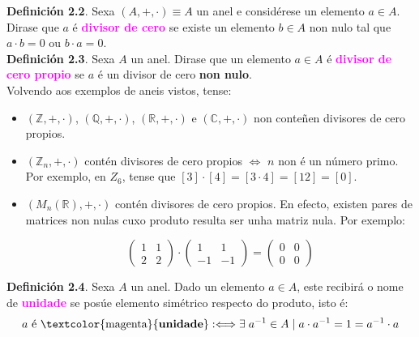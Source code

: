 \documentclass[twoside]{report}
\newcommand{\magbf}[1]{\textcolor{magenta}{\textbf{#1}}} %
\theoremstyle{mystyle}
\begin{document}
\noindent \textbf{Definición 2.2}. Sexa $(A,+,\cdot) \equiv A$ un anel e considérese un elemento $a \in A$. Dirase que $a$ é \magbf{divisor de cero} se existe un elemento $b \in A$ non nulo tal que $a \cdot b = 0$ ou $b \cdot a = 0$.\\

\noindent \textbf{Definición 2.3}. Sexa $A$ un anel. Dirase que un elemento $a \in A$ é \magbf{divisor de cero propio} se $a$ é un divisor de cero \textbf{non nulo}.\\

\noindent Volvendo aos exemplos de aneis vistos, tense:\\

\begin{itemize}

    \item $(\mathbb{Z},+,\cdot)$, $(\mathbb{Q},+,\cdot)$, $(\mathbb{R},+,\cdot)$ e $(\mathbb{C},+,\cdot)$ non conteñen divisores de cero propios.
    
    \item $(\mathbb{Z}_{n},+,\cdot)$ contén divisores de cero propios $\Longleftrightarrow$ $n$ non é un número primo. Por exemplo, en $Z_{6}$, tense que $[3] \cdot [4] = [3 \cdot 4] = [12] = [0]$.
    
    \item $(M_{n}(\mathbb{R}),+,\cdot)$ contén divisores de cero propios. En efecto, existen pares de matrices non nulas cuxo produto resulta ser unha matriz nula. Por exemplo:
    
    $$\begin{pmatrix}
    1 & 1\\
    2 & 2
    \end{pmatrix}
    \cdot
    \begin{pmatrix}
    1 & 1 \\
    -1 & -1
    \end{pmatrix}
    = \begin{pmatrix}
    0 & 0 \\
    0 & 0
    \end{pmatrix}$$
    
\end{itemize}

\noindent \textbf{Definición 2.4}. Sexa $A$ un anel. Dado un elemento $a \in A$, este recibirá o nome de \magbf{unidade} se posúe elemento simétrico respecto do produto, isto é:
$$a \text{ é \magbf{unidade}} :\Longleftrightarrow \exists \hspace{1mm} a^{-1} \in A \hspace{1mm} | \hspace{1mm} a \cdot a^{-1} = 1 = a^{-1} \cdot a$$
\end{document}
